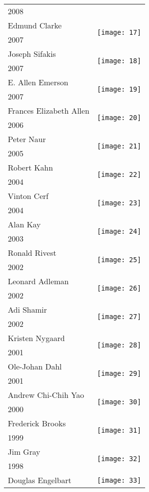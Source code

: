 \documentclass[12pt]{article}
\begin{document}
\begin{center}
\begin{longtable}{| p{} | p{} |}
2008&   \\ 
Edmund Clarke &  \multirow{2}{4em}{\texttt{[image: 17]}} \\ 
2007&   \\ 
Joseph Sifakis &  \multirow{2}{4em}{\texttt{[image: 18]}} \\ 
2007&   \\ 
E. Allen Emerson &  \multirow{2}{4em}{\texttt{[image: 19]}} \\ 
2007&   \\ 
Frances Elizabeth Allen &  \multirow{2}{4em}{\texttt{[image: 20]}} \\ 
2006&   \\ 
Peter Naur &  \multirow{2}{4em}{\texttt{[image: 21]}} \\ 
2005&   \\ 
Robert Kahn &  \multirow{2}{4em}{\texttt{[image: 22]}} \\ 
2004&   \\ 
Vinton Cerf &  \multirow{2}{4em}{\texttt{[image: 23]}} \\ 
2004&   \\ 
Alan Kay &  \multirow{2}{4em}{\texttt{[image: 24]}} \\ 
2003&   \\ 
Ronald Rivest &  \multirow{2}{4em}{\texttt{[image: 25]}} \\ 
2002&   \\ 
Leonard Adleman &  \multirow{2}{4em}{\texttt{[image: 26]}} \\ 
2002&   \\ 
Adi Shamir &  \multirow{2}{4em}{\texttt{[image: 27]}} \\ 
2002&   \\ 
Kristen Nygaard &  \multirow{2}{4em}{\texttt{[image: 28]}} \\ 
2001&   \\ 
Ole-Johan Dahl &  \multirow{2}{4em}{\texttt{[image: 29]}} \\ 
2001&   \\ 
Andrew Chi-Chih Yao &  \multirow{2}{4em}{\texttt{[image: 30]}} \\ 
2000&   \\ 
Frederick Brooks &  \multirow{2}{4em}{\texttt{[image: 31]}} \\ 
1999&   \\ 
Jim Gray &  \multirow{2}{4em}{\texttt{[image: 32]}} \\ 
1998&   \\ 
Douglas Engelbart &  \multirow{2}{4em}{\texttt{[image: 33]}} \\ 

\end{longtable}
\end{center}
\end{document}
